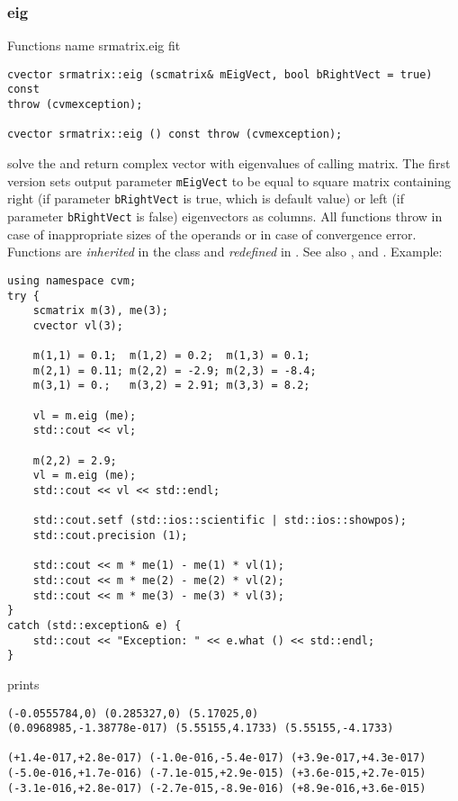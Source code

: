 \subsubsection{eig}
Functions%
\pdfdest name {srmatrix.eig} fit
\begin{verbatim}
cvector srmatrix::eig (scmatrix& mEigVect, bool bRightVect = true) const
throw (cvmexception);

cvector srmatrix::eig () const throw (cvmexception);
\end{verbatim}
solve the
and return  complex vector with eigenvalues
of  calling matrix.
The first version
sets  output parameter \verb"mEigVect" to be equal
to  square matrix containing right (if parameter
\verb"bRightVect" is true, which is default value)
or left (if parameter
\verb"bRightVect" is false)
eigenvectors as columns.
All  functions
throw 
in case of inappropriate sizes of the operands
or in case of convergence error.
Functions are \emph{inherited} in the class
and \emph{redefined} in .
See also
,
 and
.
Example:
\begin{Verbatim}
using namespace cvm;
try {
    scmatrix m(3), me(3);
    cvector vl(3);

    m(1,1) = 0.1;  m(1,2) = 0.2;  m(1,3) = 0.1;
    m(2,1) = 0.11; m(2,2) = -2.9; m(2,3) = -8.4;
    m(3,1) = 0.;   m(3,2) = 2.91; m(3,3) = 8.2;

    vl = m.eig (me);
    std::cout << vl;

    m(2,2) = 2.9;
    vl = m.eig (me);
    std::cout << vl << std::endl;

    std::cout.setf (std::ios::scientific | std::ios::showpos);
    std::cout.precision (1);

    std::cout << m * me(1) - me(1) * vl(1);
    std::cout << m * me(2) - me(2) * vl(2);
    std::cout << m * me(3) - me(3) * vl(3);
}
catch (std::exception& e) {
    std::cout << "Exception: " << e.what () << std::endl;
}
\end{Verbatim}
prints
\begin{Verbatim}
(-0.0555784,0) (0.285327,0) (5.17025,0)
(0.0968985,-1.38778e-017) (5.55155,4.1733) (5.55155,-4.1733)

(+1.4e-017,+2.8e-017) (-1.0e-016,-5.4e-017) (+3.9e-017,+4.3e-017)
(-5.0e-016,+1.7e-016) (-7.1e-015,+2.9e-015) (+3.6e-015,+2.7e-015)
(-3.1e-016,+2.8e-017) (-2.7e-015,-8.9e-016) (+8.9e-016,+3.6e-015)
\end{Verbatim}
\newpage



